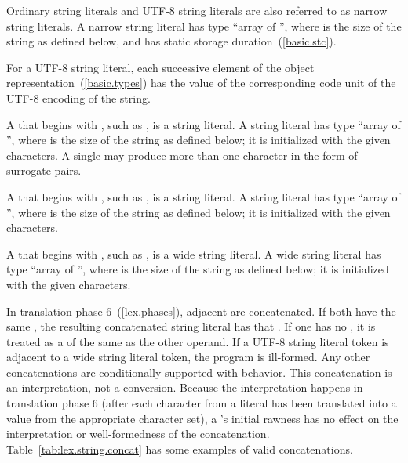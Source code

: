 \pnum
Ordinary string literals and UTF-8 string literals are
also referred to as narrow
string literals. A narrow string literal has type
%
``array of  '', where  is the size of
the string as defined below, and has static storage
duration~(\ref{basic.stc}).

\pnum
For a UTF-8 string literal, each successive element of the object
representation~(\ref{basic.types}) has the value of the corresponding
code unit of the UTF-8 encoding of the string.

\pnum
{}%
A  that begins with , such as , is
a  string literal. A  string literal has
type ``array of  '', where  is the
size of the string as defined below; it
is initialized with the given characters. A single  may
produce more than one  character in the form of
surrogate pairs.

\pnum
{}%
A  that begins with , such as , is
a  string literal. A  string literal has
type ``array of  '', where  is the
size of the string as defined below; it
is initialized with the given characters.

\pnum
{}%
A  that begins with
,
such as ,
is a wide string literal.
%
%
%
%
A wide string literal has type ``array of  '', where  is the size of the string as defined below; it
is initialized with the given characters.

\pnum
{}%
In translation phase 6~(\ref{lex.phases}), adjacent  are concatenated. If
both  have the same , the resulting concatenated string literal has
that . If one  has no , it is treated as a  of
the same  as the other operand. If a UTF-8 string literal token is adjacent to a
wide string literal token, the program is ill-formed. Any other concatenations are
conditionally-supported with 
behavior. \enternote This
concatenation is an interpretation, not a conversion.
Because the interpretation happens in translation phase 6 (after each character from a
literal has been translated into a value from the appropriate character set), a
's initial rawness has no effect on the interpretation or
well-formedness of the concatenation.
\exitnote
Table~\ref{tab:lex.string.concat} has some examples of valid concatenations.


